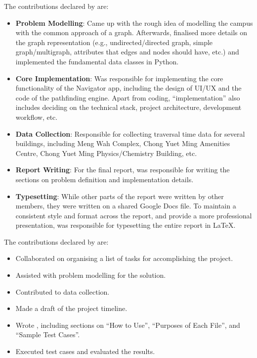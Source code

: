 \documentclass[a4paper,10pt]{amsart}
\begin{document}
The contributions declared by \textbf{\jShing} are:
\begin{itemize}
    \item \textbf{Problem Modelling}:
        Came up with the rough idea of modelling the campus with the common approach of a graph.
        Afterwards, finalised more details on the graph representation (e.g., undirected/directed graph, simple graph/multigraph, attributes that edges and nodes should have, etc.) and implemented the fundamental data classes in Python.
    \item \textbf{Core Implementation}:
        Was responsible for implementing the core functionality of the Navigator app, including the design of UI/UX and the code of the pathfinding engine.
        Apart from coding, ``implementation'' also includes deciding on the technical stack, project architecture, development workflow, etc.
    \item \textbf{Data Collection}:
        Responsible for collecting traversal time data for several buildings, including Meng Wah Complex, Chong Yuet Ming Amenities Centre, Chong Yuet Ming Physics/Chemistry Building, etc.
    \item \textbf{Report Writing}:
        For the final report, was responsible for writing the sections on problem definition and implementation details.
    \item \textbf{Typesetting}:
        While other parts of the report were written by other members, they were written on a shared Google Docs file.
        To maintain a consistent style and format across the report, and provide a more professional presentation, was responsible for typesetting the entire report in \LaTeX.
\end{itemize}

The contributions declared by \textbf{\yYe} are:
\begin{itemize}
    \item Collaborated on organising a list of tasks for accomplishing the project.
    \item Assisted with problem modelling for the solution.
    \item Contributed to data collection.
    \item Made a draft of the project timeline.
    \item Wrote , including sections on ``How to Use'', ``Purposes of Each File'', and ``Sample Test Cases''.
    \item Executed test cases and evaluated the results.
\end{itemize}
\end{document}
